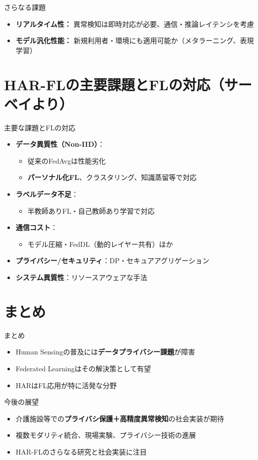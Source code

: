 \documentclass[unicode,12pt,aspectratio=169,dvipdfmx]{beamer}
\begin{document}
\begin{frame}{さらなる課題}
  \begin{itemize}
    \item \textbf{リアルタイム性：} 異常検知は即時対応が必要、通信・推論レイテンシを考慮
    \item \textbf{モデル汎化性能：} 新規利用者・環境にも適用可能か（メタラーニング、表現学習）
  \end{itemize}
\end{frame}


\section{HAR-FLの主要課題とFLの対応（サーベイより）}

\begin{frame}{主要な課題とFLの対応}
  \begin{itemize}
    \item \textbf{データ異質性（Non-IID）}：
      \begin{itemize}
        \item 従来のFedAvgは性能劣化
        \item \textbf{パーソナル化FL}、クラスタリング、知識蒸留等で対応
      \end{itemize}
    \item \textbf{ラベルデータ不足}：
      \begin{itemize}
        \item 半教師ありFL・自己教師あり学習で対応
      \end{itemize}
    \item \textbf{通信コスト}：
      \begin{itemize}
        \item モデル圧縮・FedDL（動的レイヤー共有）ほか
      \end{itemize}
    \item \textbf{プライバシー/セキュリティ}：DP・セキュアアグリゲーション
    \item \textbf{システム異質性}：リソースアウェアな手法
  \end{itemize}
\end{frame}

\section{まとめ}
\begin{frame}{まとめ}
  \begin{itemize}
    \item Human Sensingの普及には\textbf{データプライバシー課題}が障害
    \item Federated Learningはその解決策として有望
    \item HARはFL応用が特に活発な分野
  \end{itemize}
\end{frame}

\begin{frame}{今後の展望}
  \begin{itemize}
    \item 介護施設等での\textbf{プライバシ保護＋高精度異常検知}の社会実装が期待
    \item 複数モダリティ統合、現場実験、プライバシー技術の進展
    \item HAR-FLのさらなる研究と社会実装に注目
  \end{itemize}
\end{frame}
\end{document}
